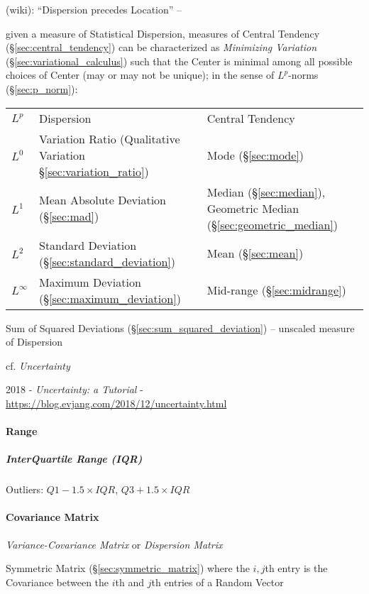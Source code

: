 (wiki): ``Dispersion precedes Location'' --

given a measure of Statistical Dispersion, measures of Central Tendency
(\S\ref{sec:central_tendency}) can be characterized as \emph{Minimizing
  Variation} (\S\ref{sec:variational_calculus}) such that the Center is
minimal among all possible choices of Center (may or may not be unique); in the
sense of $L^p$-norms (\S\ref{sec:p_norm}):
\begin{tabular}{l l l}
  $L^p$ & Dispersion & Central Tendency \\
  $L^0$ & Variation Ratio (Qualitative Variation \S\ref{sec:variation_ratio})
    & Mode (\S\ref{sec:mode}) \\
  $L^1$ & Mean Absolute Deviation (\S\ref{sec:mad})
    & Median (\S\ref{sec:median}),
      Geometric Median (\S\ref{sec:geometric_median}) \\
  $L^2$ & Standard Deviation (\S\ref{sec:standard_deviation})
    & Mean (\S\ref{sec:mean}) \\
  $L^\infty$ & Maximum Deviation (\S\ref{sec:maximum_deviation})
    & Mid-range (\S\ref{sec:midrange})
\end{tabular}

\fist Sum of Squared Deviations (\S\ref{sec:sum_squared_deviation}) -- unscaled
measure of Dispersion

cf. \emph{Uncertainty}

2018 - \emph{Uncertainty: a Tutorial} -
\url{https://blog.evjang.com/2018/12/uncertainty.html}



\paragraph{Range}\label{sec:range}\hfill

\subparagraph{InterQuartile Range (IQR)}\label{sec:iqr}\hfill

Outliers:  $Q1 - 1.5 \times IQR$, $Q3 + 1.5 \times IQR$



\paragraph{Covariance Matrix}\label{sec:covariance_matrix}\hfill

\emph{Variance-Covariance Matrix} or \emph{Dispersion Matrix}

Symmetric Matrix (\S\ref{sec:symmetric_matrix}) where the $i,j$th entry is the
Covariance between the $i$th and $j$th entries of a Random Vector

